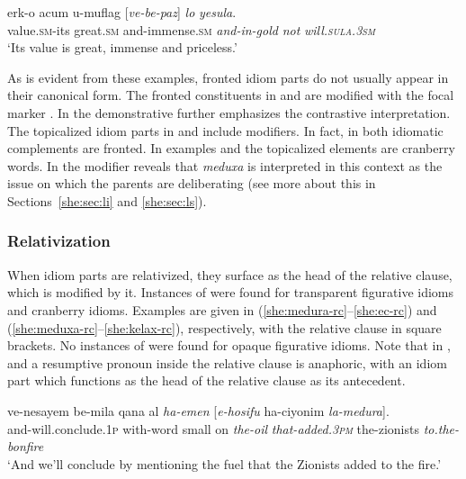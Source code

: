 \documentclass[output=paper]{langsci/langscibook}
\begin{document}
	\ea\label{she:yesula-top}
    	\gll {\ayin}erk-o {\ayin}acum u-muflag \textnormal{[}\textit{ve-be-paz}\textnormal{]} \textit{lo} \textit{yesula}.\\
    	   value.\textsc{sm}-its great.\textsc{sm} and-immense.\textsc{sm} \textit{and-in-gold} \textit{not} \textit{will.\textsc{sula}.\textsc{3sm}}\\
    	\glt `Its value is great, immense and priceless.'
	\z

As is evident from these examples, fronted idiom parts do not usually appear in their canonical form. The fronted constituents in  and  are modified with the focal marker . In  the demonstrative  further emphasizes the contrastive interpretation. The topicalized idiom parts in  and  include modifiers. In fact, in  both idiomatic complements are fronted. In examples  and  the topicalized elements are cranberry words. In  the modifier  reveals that \textit{meduxa} is interpreted in this context as the issue on which the parents are deliberating (see more about this in Sections~\ref{she:sec:li} and \ref{she:sec:ls}).

\subsubsection{Relativization}
\label{she:sec:relativization}
When idiom parts are relativized, they surface as the head of the relative clause, which is modified by it. Instances of  were found for transparent figurative idioms and cranberry idioms. Examples are given in (\ref{she:medura-rc}--\ref{she:ec-rc}) and (\ref{she:meduxa-rc}--\ref{she:kelax-rc}), respectively, with the relative clause in square brackets. No instances of  were found for opaque figurative idioms.
Note that in ,  and  a resumptive pronoun inside the relative clause is anaphoric, with an idiom part which functions as the head of the relative clause as its antecedent.

    \ea\label{she:medura-rc}
        \gll ve-nesayem be-mila q{\tet}ana {\ayin}al \textit{ha-{\shin}emen} \textnormal{[}\textit{{\shin}e-hosifu} ha-ciyonim \textit{la-medura}\textnormal{]}.\\
            and-will.conclude.\textsc{1p} with-word small on \textit{the-oil} \textit{that-added.\textsc{3pm}} the-zionists \textit{{to.the-bonfire}}\\
        \glt `And we'll conclude by mentioning the fuel that the Zionists added to the fire.'
    \z
\end{document}

